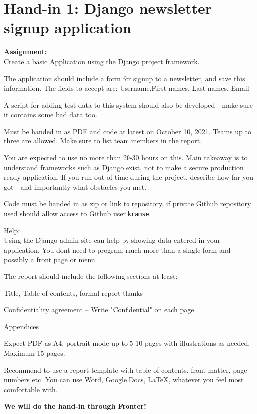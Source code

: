 \documentclass[a4paper,11pt,notitlepage]{report}
\begin{document}
\rm
{}

\newcommand{\emne}[1]{Software Security course}
\newcommand{\kursus}[1]{Software Security course}
\newcommand{\kursusnavn}[1]{Software Security course\\ exercises}




\setcounter{tocdepth}{0}

\normal



\chapter*{Hand-in 1: Django newsletter signup application}

{\bf Assignment:}\\
Create a basic Application using the Django project framework.

The application should include a form for signup to a newsletter, and save this information.
The fields to accept are: Username,First names, Last names, Email

A script for adding test data to this system should also be developed - make sure it contains some bad data too.

Must be handed in as PDF and code at latest on October 10, 2021. Teams up to three are allowed. Make sure to list team members in the report.

You are expected to use no more than 20-30 hours on this. Main takeaway is to understand frameworks such as Django exist, not to make a secure production ready application.
If you run out of time during the project, describe how far you got - and importantly what obstacles you met.

Code must be handed in as zip or link to repository, if private Github repository used should allow access to Github user \verb+kramse+

Help:\\
Using the Django admin site can help by showing data entered in your application. You dont need to program much more than a single form and possibly a front page or menu.


The report should include the following sections at least:
\begin{list2}
\item Title, Table of contents, formal report thanks
\item Confidentiality agreement -- Write "Confidential" on each page
\item Appendices
\end{list2}

Expect PDF as A4, portrait mode up to 5-10 pages with illustrations as needed. Maximum 15 pages.

Recommend to use a report template with table of contents, front matter, page numbers etc. You can use Word, Google Docs, LaTeX, whatever you feel most comfortable with.

{\bf We will do the hand-in through Fronter!}
\end{document}
